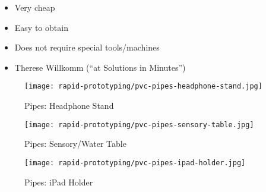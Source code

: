 \begin{frame}
    \begin{itemize}
        \item Very cheap
        \item Easy to obtain
        \item Does not require special tools/machines
        \item Therese Willkomm (``\acs{at} Solutions in Minutes'')
    \end{itemize}
    \begin{figure}
        \texttt{[image: rapid-prototyping/pvc-pipes-headphone-stand.jpg]}
        \caption{ Pipes: Headphone Stand}
    \end{figure}
\end{frame}

\begin{frame}
    \begin{figure}
        \texttt{[image: rapid-prototyping/pvc-pipes-sensory-table.jpg]}
        \caption{ Pipes: Sensory/Water Table}
    \end{figure}
\end{frame}

\begin{frame}
    \begin{figure}
        \texttt{[image: rapid-prototyping/pvc-pipes-ipad-holder.jpg]}
        \caption{ Pipes: iPad Holder}
    \end{figure}
\end{frame}
